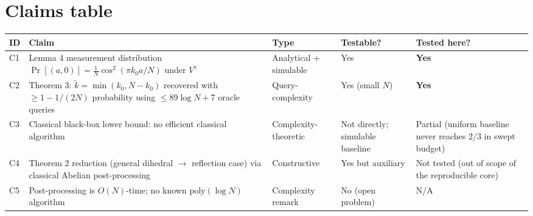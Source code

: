 \documentclass[11pt]{article}
\begin{document}
\section{Claims table}
\begin{center}
\begin{tabular}{@{}p{0.9cm} p{6.4cm} p{2.4cm} p{1.8cm} p{2.6cm}@{}}
\toprule
ID & Claim & Type & Testable? & Tested here? \\
\midrule
C1 & Lemma 4 measurement distribution
     $\Pr[(a,0)] = \tfrac{1}{N}\cos^2(\pi k_0 a/N)$ under $V^\gamma$
     & Analytical + simulable & Yes & \textbf{Yes} \\
C2 & Theorem 3: $\tilde k=\min(k_0,N-k_0)$ recovered with $\geq 1-1/(2N)$
     probability using $\leq 89\log N + 7$ oracle queries
     & Query-complexity & Yes (small $N$) & \textbf{Yes} \\
C3 & Classical black-box lower bound: no efficient classical algorithm
     & Complexity-theoretic & Not directly; simulable baseline & Partial
     (uniform baseline never reaches $2/3$ in swept budget) \\
C4 & Theorem 2 reduction (general dihedral $\to$ reflection case)
     via classical Abelian post-processing
     & Constructive & Yes but auxiliary & Not tested (out of scope of the reproducible core) \\
C5 & Post-processing is $O(N)$-time; no known $\mathrm{poly}(\log N)$ algorithm
     & Complexity remark & No (open problem) & N/A \\
\bottomrule
\end{tabular}
\end{center}
\end{document}
